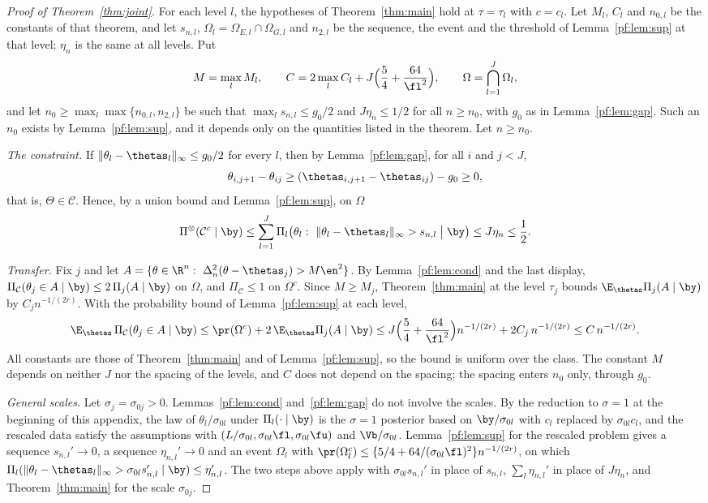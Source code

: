 \begin{proof}[Proof of Theorem~\ref{thm:joint}]
For each level $l$, the hypotheses of Theorem~\ref{thm:main} hold at $\tau=\tau_l$ with $c=c_l$. Let $M_l$, $C_l$ and $n_{0,l}$ be the constants of that theorem, and let $s_{n,l}$, $\Omega_l=\Omega_{E,l}\cap\Omega_{G,l}$ and $n_{2,l}$ be the sequence, the event and the threshold of Lemma~\ref{pf:lem:sup} at that level; $\eta_n$ is the same at all levels. Put
\[
M=\max_{l}M_l,\qquad C=2\max_{l}C_l+J\Bigl(\frac54+\frac{64}{\fl^2}\Bigr),\qquad \Omega=\bigcap_{l=1}^J\Omega_l ,
\]
and let $n_0\ge\max_l\max\{n_{0,l},n_{2,l}\}$ be such that $\max_ls_{n,l}\le g_0/2$ and $J\eta_n\le1/2$ for all $n\ge n_0$, with $g_0$ as in Lemma~\ref{pf:lem:gap}. Such an $n_0$ exists by Lemma~\ref{pf:lem:sup}, and it depends only on the quantities listed in the theorem. Let $n\ge n_0$.

\emph{The constraint.} If $\|\theta_l-\thetas_l\|_\infty\le g_0/2$ for every $l$, then by Lemma~\ref{pf:lem:gap}, for all $i$ and $j<J$,
\[
\theta_{i,j+1}-\theta_{ij}\ge(\thetas_{i,j+1}-\thetas_{ij})-g_0\ge0 ,
\]
that is, $\Theta\in\mathcal C$. Hence, by a union bound and Lemma~\ref{pf:lem:sup}, on $\Omega$
\[
\Pi^{\otimes}(\mathcal C^c\mid\by)\le\sum_{l=1}^J\Pi_l\bigl(\theta_l:\ \|\theta_l-\thetas_l\|_\infty>s_{n,l}\bigm|\by\bigr)\le J\eta_n\le\frac12 .
\]

\emph{Transfer.} Fix $j$ and let $A=\{\theta\in\R^n:\ \Delta_n^2(\theta-\thetas_j)>M\en^2\}$. By Lemma~\ref{pf:lem:cond} and the last display, $\Pi_{\mathcal C}(\theta_j\in A\mid\by)\le2\,\Pi_j(A\mid\by)$ on $\Omega$, and $\Pi_{\mathcal C}\le1$ on $\Omega^c$. Since $M\ge M_j$, Theorem~\ref{thm:main} at the level $\tau_j$ bounds $\E_{\thetas}\Pi_j(A\mid\by)$ by $C_jn^{-1/(2r)}$. With the probability bound of Lemma~\ref{pf:lem:sup} at each level,
\[
\E_{\thetas}\,\Pi_{\mathcal C}(\theta_j\in A\mid\by)\le\pr(\Omega^c)+2\,\E_{\thetas}\Pi_j(A\mid\by)
\le J\Bigl(\frac54+\frac{64}{\fl^2}\Bigr)n^{-1/(2r)}+2C_j\,n^{-1/(2r)}\le C\,n^{-1/(2r)} .
\]
All constants are those of Theorem~\ref{thm:main} and of Lemma~\ref{pf:lem:sup}, so the bound is uniform over the class. The constant $M$ depends on neither $J$ nor the spacing of the levels, and $C$ does not depend on the spacing; the spacing enters $n_0$ only, through $g_0$.

\emph{General scales.} Let $\sigma_j=\sigma_{0j}>0$. Lemmas~\ref{pf:lem:cond} and~\ref{pf:lem:gap} do not involve the scales. By the reduction to $\sigma=1$ at the beginning of this appendix, the law of $\theta_l/\sigma_{0l}$ under $\Pi_l(\cdot\mid\by)$ is the $\sigma=1$ posterior based on $\by/\sigma_{0l}$ with $c_l$ replaced by $\sigma_{0l}c_l$, and the rescaled data satisfy the assumptions with $(L/\sigma_{0l},\sigma_{0l}\fl,\sigma_{0l}\fu)$ and $\Vb/\sigma_{0l}$. Lemma~\ref{pf:lem:sup} for the rescaled problem gives a sequence $s_{n,l}'\to0$, a sequence $\eta_{n,l}'\to0$ and an event $\Omega_l$ with $\pr(\Omega_l^c)\le\{5/4+64/(\sigma_{0l}\fl)^2\}n^{-1/(2r)}$, on which $\Pi_l(\|\theta_l-\thetas_l\|_\infty>\sigma_{0l}s_{n,l}'\mid\by)\le\eta_{n,l}'$. The two steps above apply with $\sigma_{0l}s_{n,l}'$ in place of $s_{n,l}$, $\sum_l\eta_{n,l}'$ in place of $J\eta_n$, and Theorem~\ref{thm:main} for the scale $\sigma_{0j}$.
\end{proof}


